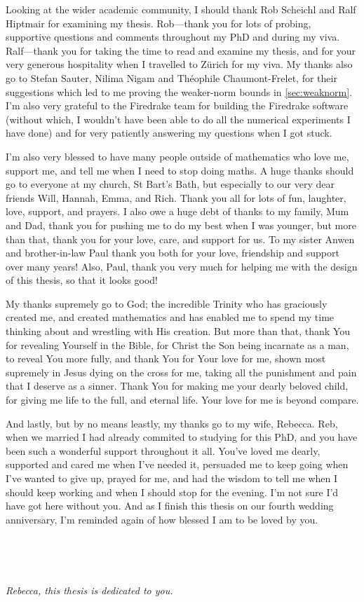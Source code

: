 {  Looking at the wider academic community, I should thank Rob Scheichl and Ralf Hiptmair for examining my thesis. Rob---thank you for lots of probing, supportive questions and comments throughout my PhD and during my viva. Ralf---thank you for taking the time to read and examine my thesis, and for your very generous hospitality when I travelled to Z\"urich for my viva. My thanks also go to Stefan Sauter, Nilima Nigam and Th\'eophile Chaumont-Frelet, for their suggestions which led to me proving the weaker-norm bounds in \cref{sec:weaknorm}. I'm also very grateful to the Firedrake team for building the Firedrake software (without which, I wouldn't have been able to do all the numerical experiments I have done) and for very patiently answering my questions when I got stuck.
  
I'm also very blessed to have many people outside of mathematics who love me, support me, and tell me when I need to stop doing maths. A huge thanks should go to everyone at my church, St Bart's Bath, but especially to our very dear friends Will, Hannah, Emma, and Rich. Thank you all for lots of fun, laughter, love, support, and prayers. I also owe a huge debt of thanks to my family, Mum and Dad, thank you for pushing me to do my best when I was younger, but more than that, thank you for your love, care, and support for us. To my sister Anwen and brother-in-law Paul thank you both for your love, friendship and support over many years! Also, Paul, thank you very much for helping me with the design of this thesis, so that it looks good!

My thanks supremely go to God; the incredible Trinity who has graciously created me, and created mathematics and has enabled me to spend my time thinking about and wrestling with His creation. But more than that, thank You for revealing Yourself in the Bible, for Christ the Son being incarnate as a man, to reveal You more fully, and thank You for Your love for me, shown most supremely in Jesus  dying on the cross for me, taking all the punishment and pain that I deserve as a sinner. Thank You for making me your dearly beloved child, for giving me life to the full, and eternal life. Your love for me is beyond compare.
\thispagestyle{plain} %

And lastly, but by no means leastly, my thanks go to my wife, Rebecca. Reb, when we married I had already commited to studying for this PhD, and you have been such a wonderful support throughout it all. You've loved me dearly, supported and cared me when I've needed it, persuaded me to keep going when I've wanted to give up, prayed for me, and had the wisdom to tell me when I should keep working and when I should stop for the evening. I'm not sure I'd have got here without you. And as I finish this thesis on our fourth wedding anniversary, I'm reminded again of how blessed I am to be loved by you.

\

\

\begin{center}
  {\it Rebecca, this thesis is dedicated to you.}
  \end{center}
}
